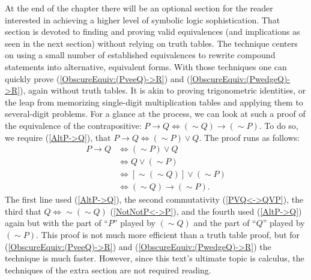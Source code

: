 At the end of the chapter there will be an optional section
for the reader interested in achieving a higher level of 
symbolic logic sophistication.  That section is devoted
to finding and proving valid equivalences (and implications
as seen in the next section) without relying on truth tables.
The technique centers on using a small number of
established equivalences to rewrite compound statements
into alternative, equivalent forms. With those techniques
one can quickly prove (\ref{ObscureEquiv:(PveeQ)->R})
and (\ref{ObscureEquiv:(PwedgeQ)->R}), again without truth
tables.   It is akin to proving trigonometric
identities, or the leap from memorizing single-digit multiplication
tables and applying them to several-digit problems.  For a glance
at the process, we can look at such a proof of the equivalence of 
the contrapositive:  $P\longrightarrow Q\iff(\sim Q)\longrightarrow(\sim P)$.
To do so, we require (\ref{AltP->Q}), that $P\longrightarrow Q
\iff(\sim P)\vee Q$.  The proof runs as follows:
\begin{align*}
P\longrightarrow Q&\iff(\sim P)\vee Q\\
                  &\iff Q\vee(\sim P)\\
                  &\iff [\sim(\sim Q)]\vee(\sim P)\\
                  &\iff (\sim Q)\longrightarrow(\sim P).\end{align*}
The first line used (\ref{AltP->Q}), the second commutativity
(\ref{PVQ<->QVP}), the 
third that $Q\iff\sim(\sim Q)$ (\ref{NotNotP<->P}), and the fourth used
(\ref{AltP->Q}) again but with the part of ``$P$'' played
by $(\sim Q)$ and the part of ``$Q$'' played by $(\sim P)$.
This proof is not much more efficient than a truth table
proof, but for (\ref{ObscureEquiv:(PveeQ)->R})
and (\ref{ObscureEquiv:(PwedgeQ)->R}) the technique is much faster.
However, since this text's ultimate topic is calculus, the techniques of 
the extra section are not required reading.  



